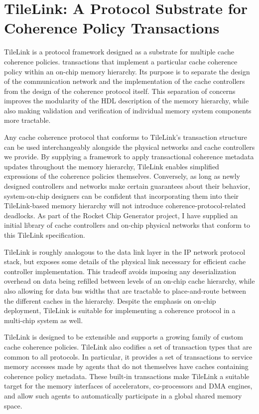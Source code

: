 \chapter{TileLink: A Protocol Substrate for Coherence Policy Transactions }
\label{c.tilelink}

TileLink is a protocol framework designed as a substrate for multiple cache coherence policies.
transactions
that implement a particular cache coherence policy within an on-chip memory hierarchy.
Its purpose is to separate the design of the communication network and the implementation of the cache controllers from the design of the coherence protocol itself.
This separation of concerns improves the modularity of the HDL description of the memory hierarchy,
while also making validation and verification of individual memory system components more tractable.

Any cache coherence protocol that conforms to TileLink's transaction structure can be used interchangeably alongside the physical networks and cache controllers we provide.
By supplying a framework to apply transactional coherence metadata updates throughout the memory hierarchy, TileLink enables simplified expressions of the coherence policies themselves.
Conversely, as long as newly designed controllers and networks make certain guarantees about their behavior,
system-on-chip designers can be confident that incorporating them into their TileLink-based memory hierarchy will not introduce coherence-protocol-related deadlocks.
As part of the Rocket Chip Generator project, I have supplied an initial library of cache controllers and on-chip physical networks that conform to this TileLink specification.

TileLink is roughly analogous to the data link layer in the IP network protocol stack, but exposes some details of the physical link necessary for efficient cache controller implementation.
This tradeoff avoids imposing any deserialization overhead on data being refilled between levels of an on-chip cache hierarchy, while also allowing for data bus widths
that are tractable to place-and-route between the different caches in the hierarchy.
Despite the emphasis on on-chip deployment, TileLink is suitable for implementing a coherence protocol in a multi-chip system as well.

TileLink is designed to be extensible and supports a growing family of custom cache coherence policies.
TileLink also codifies a set of transaction types that are common to all protocols.
In particular, it provides a set of transactions to service memory accesses made by agents that do not themselves have caches containing coherence policy metadata.
These built-in transactions make TileLink a suitable target for the memory interfaces of accelerators, co-processors and DMA engines,
and allow such agents to automatically participate in a global shared memory space.


